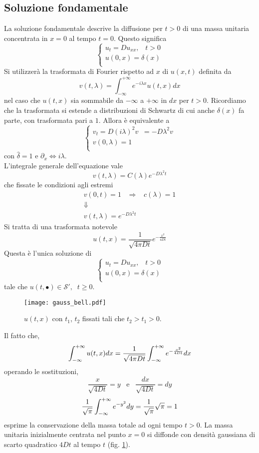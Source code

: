 \subsection{Soluzione fondamentale}
La soluzione fondamentale descrive la diffusione per $t>0$ di una massa unitaria
concentrata in $x=0$ al tempo $t=0$. Questo significa
\[
	\left\{
	\begin{array}{l}
		u_t=Du_{xx}, \;\;\; t>0 \\
		u(0,x)= \delta(x)  \\
	\end{array}
	\right.
\]
Si utilizzer\`a la trasformata di Fourier rispetto ad $x$ di $u(x,t)$ definita
da
\[
	v(t,\lambda)=\int_{-\infty}^{+\infty} e^{-i\lambda x} u(t,x) dx
\]
nel caso che $u(t,x)$ sia sommabile da $- \infty$ a $+ \infty$ in $dx$ per
$t>0$. Ricordiamo che la trasformata si estende a distribuzioni di Schwartz
di cui anche $\delta (x)$ fa parte, con trasformata pari a $1$.
Allora \`e equivalente a
\[
	\left\{
	\begin{array}{l}
		v_t=D\left( i\lambda \right)^2 v \;\; = -D\lambda^2 v\\
		v(0,\lambda)= 1  \\
	\end{array}
	\right.
\]
con $\hat{\delta}= 1$ e $\partial_x \Leftrightarrow i\lambda$.\\
L'integrale generale dell'equazione vale
\[
	v(t,\lambda)= C(\lambda)e^{-D\lambda^2 t}
\]
che fissate le condizioni agli estremi
\[
\begin{array}{c}
	v(0,t)= 1 \;\;\; \Rightarrow \;\;\; c(\lambda)= 1\\
	\Downarrow \\
	v(t,\lambda)= e^{-D\lambda^2 t}
\end{array}
\]
Si tratta di una trasformata notevole
\[
	u(t,x)= \frac{1}{\sqrt{4 \pi D t}}
	e^{-\frac{x^2}{4Dt}}
\]
Questa \`e l'unica soluzione di
\[
	\left\{
	\begin{array}{l}
		u_t=Du_{xx}, \;\;\; t>0 \\
		u(0,x)= \delta(x)  \\
	\end{array}
	\right.
\]
tale che $u(t, \bullet) \in \mathcal{S'}, \;\; t \geq 0$.
\begin{figure}[H]
	\centering
	\texttt{[image: gauss\_bell.pdf]}
	\caption{$u(t,x)$ con $t_1$, $t_2$ fissati tali che $t_2>t_1>0$.}
	\label{gauss_bell}
\end{figure}
Il fatto che,
\[
	\int_{- \infty}^{+ \infty} u(t,x) dx =
	\frac{1}{\sqrt{4 \pi D t}}
	\int_{- \infty}^{+ \infty} e^{-\frac{x^2}{4Dt}} dx
\]
operando le sostituzioni,
\[
\frac{x}{\sqrt{4Dt}}= y \;\;\; \text{e} \;\;\; \frac{dx}{\sqrt{4Dt}}= dy
\]
\[
	\frac{1}{\sqrt{\pi}}\int_{- \infty}^{+ \infty} e^{-y^2} dy= \frac{1}{\sqrt{\pi}}\sqrt{\pi}=1
\]
esprime la conservazione della massa totale ad ogni tempo $t>0$.
La massa unitaria inizialmente centrata nel punto $x=0$ si diffonde con
densit\`a gaussiana di scarto quadratico $4Dt$ al tempo $t$ (fig.
\ref{gauss_bell}).
